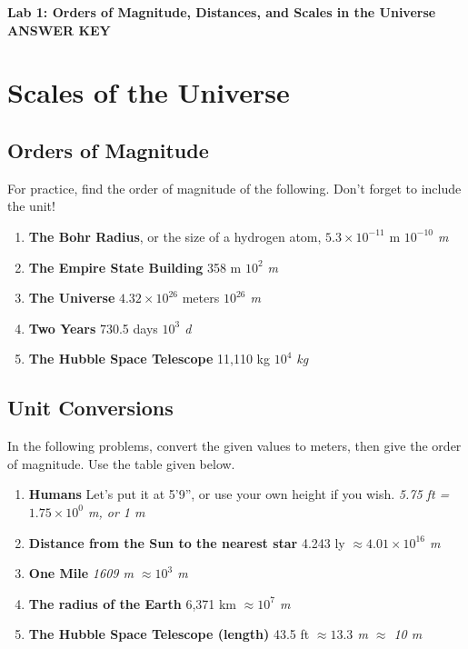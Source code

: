 \documentclass[12pt]{article}%
\begin{document}
\begin{flushleft}
\begin{center}

\Large\textbf{Lab 1: Orders of Magnitude, Distances, and Scales in the Universe ANSWER KEY}
\end{center}

\vspace{20 pt}

\paragraph{}


\section{Scales of the Universe}
\subsection{Orders of Magnitude}

For practice, find the order of magnitude of the following.  Don't forget to include the unit!
\begin{enumerate}
\item \textbf{The Bohr Radius}, or the size of a hydrogen atom, $5.3 \times 10^{-11}$ m {\it $10^{-10}$ m}
\item \textbf{The Empire State Building} 358 m {\it $10^2$ m}
\item \textbf{The Universe} $4.32 \times 10^{26}$ meters {\it $10^{26}$ m}
\item \textbf{Two Years} 730.5 days  {\it $10^{3}$ d}
\item \textbf{The Hubble Space Telescope} 11,110 kg {\it $10^{4}$ kg}
\end{enumerate}

\subsection{Unit Conversions}

In the following problems, convert the given values to meters, then give the order of magnitude.  Use the table given below.  
\begin{enumerate}
\item \textbf{Humans} Let's put it at 5'9'', or use your own height if you wish. {\it 5.75 ft = $1.75\times 10^0$ m, or 1 m}
\item \textbf{Distance from the Sun to the nearest star} 4.243 ly {\it $\approx4.01\times 10^{16}$ m}
\item \textbf{One Mile} {\it 1609 m $\approx 10^{3}$ m}
\item \textbf{The radius of the Earth} 6,371 km {\it  $\approx10^7$ m}
\item \textbf{The Hubble Space Telescope (length)} 43.5 ft {\it  $\approx 13.3$ m $\approx$ 10 m}
\end{enumerate}



\end{flushleft}
\end{document}
